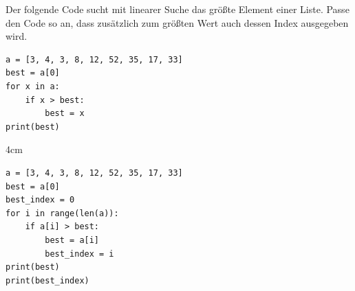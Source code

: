 \question[4]
Der folgende Code sucht mit linearer Suche das größte Element einer Liste.
 Passe den Code so an, dass zusätzlich zum größten Wert auch dessen Index ausgegeben wird.
\begin{lstlisting}
a = [3, 4, 3, 8, 12, 52, 35, 17, 33]
best = a[0]
for x in a:
    if x > best:
        best = x
print(best)
\end{lstlisting}

\begin{solutionbox}{4cm}
\begin{lstlisting}
a = [3, 4, 3, 8, 12, 52, 35, 17, 33]
best = a[0]
best_index = 0
for i in range(len(a)):
    if a[i] > best:
        best = a[i]
        best_index = i
print(best)
print(best_index)
\end{lstlisting}
\end{solutionbox}